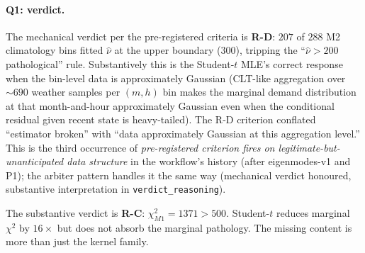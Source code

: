 \documentclass[11pt]{article}
\theoremstyle{definition}
\theoremstyle{plain}
\begin{document}
\paragraph{Q1: verdict.}
The mechanical verdict per the pre-registered criteria is \textbf{R-D}:
$207$ of $288$ M2 climatology bins fitted $\hat\nu$ at the upper
boundary ($300$), tripping the ``$\hat\nu > 200$ pathological'' rule.
Substantively this is the Student-$t$ MLE's correct response when
the bin-level data is approximately Gaussian (CLT-like aggregation
over $\sim 690$ weather samples per $(m, h)$ bin makes the marginal
demand distribution at that month-and-hour approximately Gaussian
even when the conditional residual given recent state is heavy-tailed).
The R-D criterion conflated ``estimator broken'' with ``data
approximately Gaussian at this aggregation level.'' This is the third
occurrence of \emph{pre-registered criterion fires on legitimate-but-
unanticipated data structure} in the workflow's history (after
eigenmodes-v1 and P1); the arbiter pattern handles it the same way
(mechanical verdict honoured, substantive interpretation in
\texttt{verdict\_reasoning}).

The substantive verdict is \textbf{R-C}: $\chi^{2}_{M1} = 1371 > 500$.
Student-$t$ reduces marginal $\chi^{2}$ by $16\times$ but does not
absorb the marginal pathology. The missing content is more than
just the kernel family.
\end{document}
